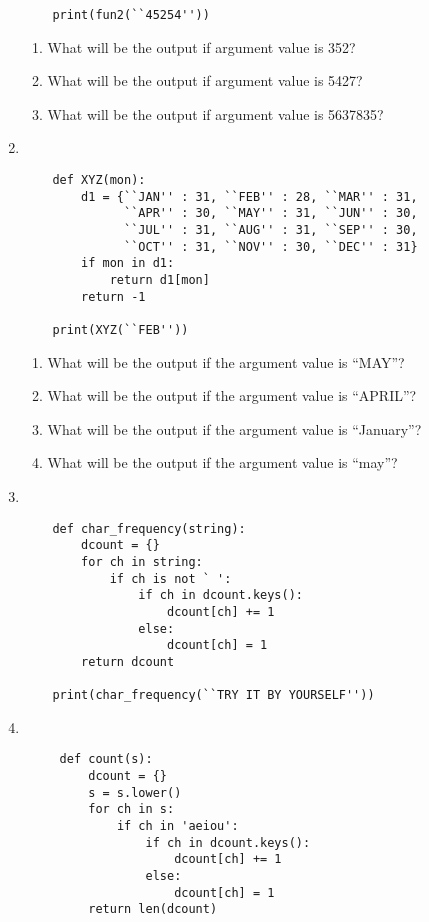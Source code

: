 \documentclass[11pt,a4paper]{article}
\def\AnswerBox{\fbox{\begin{minipage}{4in}\hfill\vspace{0.5in}\end{minipage}}}
\begin{document}
\begin{enumerate}[label=\bfseries Program \arabic*:]
\begin{lstlisting}
    print(fun2(``45254'')) 
    \end{lstlisting}
    \AnswerBox
    \begin{enumerate}[label=\bfseries Q\arabic*:]\itemsep10pt
         \item What will be the output if argument value is 352?
         \item What will be the output if argument value is 5427?
         \item What will be the output if argument value is 5637835?   
    \end{enumerate}
    \item ~
    \begin{lstlisting}
    def XYZ(mon):
        d1 = {``JAN'' : 31, ``FEB'' : 28, ``MAR'' : 31, 
              ``APR'' : 30, ``MAY'' : 31, ``JUN'' : 30, 
              ``JUL'' : 31, ``AUG'' : 31, ``SEP'' : 30, 
              ``OCT'' : 31, ``NOV'' : 30, ``DEC'' : 31}
        if mon in d1:
            return d1[mon]
        return -1

    print(XYZ(``FEB''))
    \end{lstlisting}
    \AnswerBox

    \begin{enumerate}[label=\bfseries Q\arabic*:]\itemsep10pt
         \item What will be the output if the argument value is ``MAY''?
         \item What will be the output if the argument value is ``APRIL''?
         \item What will be the output if the argument value is ``January''?
         \item What will be the output if the argument value is ``may''?
    \end{enumerate}
    \item ~
    \begin{lstlisting}
    def char_frequency(string):
        dcount = {}
        for ch in string:
            if ch is not ` ':
                if ch in dcount.keys():
                    dcount[ch] += 1
                else:
                    dcount[ch] = 1 
        return dcount

    print(char_frequency(``TRY IT BY YOURSELF''))
    \end{lstlisting}
    \AnswerBox

    \item ~
    \begin{lstlisting}
     def count(s):
         dcount = {}
         s = s.lower()
         for ch in s:
             if ch in 'aeiou':
                 if ch in dcount.keys():
                     dcount[ch] += 1
                 else:
                     dcount[ch] = 1
         return len(dcount)


\end{lstlisting}
\end{enumerate}
\end{document}
